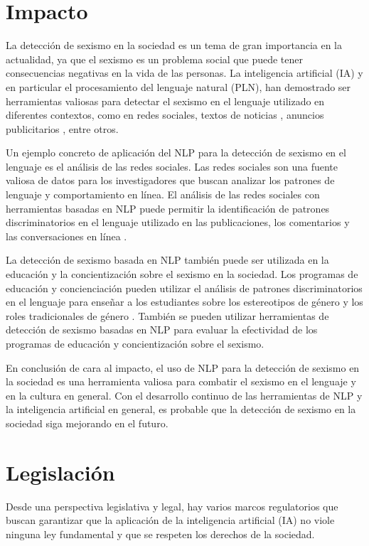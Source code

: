 
\section{Impacto}
La detección de sexismo en la sociedad es un tema de gran importancia en la actualidad, ya que el sexismo es un problema social que puede tener consecuencias negativas en la vida de las personas. La inteligencia artificial (IA) y en particular el procesamiento del lenguaje natural (PLN), han demostrado ser herramientas valiosas para detectar el sexismo en el lenguaje utilizado en diferentes contextos, como en redes sociales, textos de noticias \cite{mosqueda2023uso}, anuncios publicitarios \cite{villanueva2013autodependencia}, entre otros.

Un ejemplo concreto de aplicación del NLP para la detección de sexismo en el lenguaje es el análisis de las redes sociales. Las redes sociales son una fuente valiosa de datos para los investigadores que buscan analizar los patrones de lenguaje y comportamiento en línea. El análisis de las redes sociales con herramientas basadas en NLP puede permitir la identificación de patrones discriminatorios en el lenguaje utilizado en las publicaciones, los comentarios y las conversaciones en línea \cite{racca2022deteccion}.

La detección de sexismo basada en NLP también puede ser utilizada en la educación y la concientización sobre el sexismo en la sociedad. Los programas de educación \cite{calero2021modelo} y concienciación pueden utilizar el análisis de patrones discriminatorios en el lenguaje para enseñar a los estudiantes sobre los estereotipos de género y los roles tradicionales de género \cite{azpillaga2021analisis}. También se pueden utilizar herramientas de detección de sexismo basadas en NLP para evaluar la efectividad de los programas de educación y concientización sobre el sexismo.

En conclusión de cara al impacto, el uso de NLP para la detección de sexismo en la sociedad es una herramienta valiosa para combatir el sexismo en el lenguaje y en la cultura en general. Con el desarrollo continuo de las herramientas de NLP y la inteligencia artificial en general, es probable que la detección de sexismo en la sociedad siga mejorando en el futuro.

\section{Legislación}
Desde una perspectiva legislativa y legal, hay varios marcos regulatorios que buscan garantizar que la aplicación de la inteligencia artificial (IA) no viole ninguna ley fundamental y que se respeten los derechos de la sociedad.

